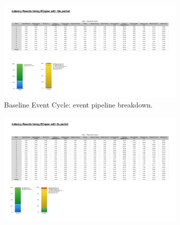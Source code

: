       \begin{figure}[ht!]
        \centering
        \begin{subfigure}{.5\textwidth}
          \centering
          \includegraphics[height=\linewidth]{./images/edge_ecspec_effective_breakdown}
          \caption{Baseline Event Cycle: event pipeline breakdown.}
          \label{fig:ecspec_effective_base}
          \end{subfigure}%
          \begin{subfigure}{.5\textwidth}
            \centering
            \includegraphics[height=\linewidth]{./images/edge_ecspecf_effective_breakdown}

\end{subfigure}
\end{figure}

